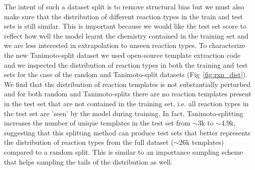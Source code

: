 The intent of such a dataset split is to remove structural bias but we must also make sure that the distribution of different reaction types in the train and test sets is still similar. This is important because we would like the test set score to reflect how well the model learnt the chemistry contained in the training set and we are less interested in extrapolation to unseen reaction types. To characterize the new Tanimoto-split dataset we used open-source template extraction code~\cite{Coley19WLDN5} and we inspected the distribution of reaction types in both the training and test sets for the case of the random and Tanimoto-split datasets (Fig~\ref{fig:rxn_dist}). We find that the distribution of reaction templates is not substantially perturbed and for both random and Tanimoto-splits there are no reaction templates present in the test set that are not contained in the training set, i.e. all reaction types in the test set are 'seen' by the model during training. In fact, Tanimoto-splitting increases the number of unique templates in the test set from $\sim$3k to $\sim$4.9k, suggesting that this splitting method can produce test sets that better represents the distribution of reaction types from the full dataset ($\sim$26k templates) compared to a random split. This is similar to an importance sampling scheme that helps sampling the tails of the distribution as well.

